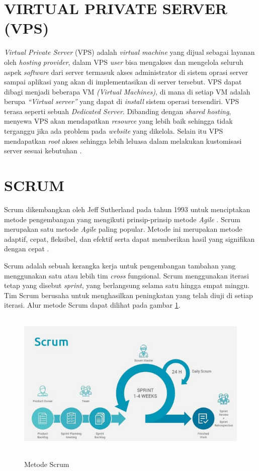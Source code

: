 \section{\uppercase{VIRTUAL PRIVATE SERVER (VPS)}}
\textit{Virtual Private Server} (VPS) adalah \textit{virtual machine} yang dijual sebagai layanan oleh \textit{hosting provider}, dalam VPS \textit{user} bisa mengakses dan mengelola seluruh aspek \textit{software} dari server termasuk akses administrator di sistem oprasi server sampai aplikasi yang akan di implementasikan di server tersebut. VPS dapat dibagi menjadi beberapa VM \textit{(Virtual Machines)}, di mana di setiap VM adalah berupa \textit{“Virtual server”} yang dapat di \textit{install} sistem operasi tersendiri. VPS terasa seperti sebuah \textit{Dedicated Server}. Dibanding dengan \textit{shared hosting}, menyewa VPS akan mendapatkan \textit{resource} yang lebih baik sehingga tidak terganggu jika ada problem pada \textit{website} yang dikelola. Selain itu VPS mendapatkan \textit{root} akses sehingga lebih leluasa dalam melakukan kustomisasi server sesuai kebutuhan \citep{hamida2017analisis}.

\section{\uppercase{SCRUM}}
Scrum dikembangkan oleh Jeff Sutherland pada tahun 1993 untuk menciptakan metode pengembangan yang mengikuti prinsip-prinsip metode \textit{Agile} \citep{fernando2018rancang}. Scrum merupakan satu metode \textit{Agile} paling popular. Metode ini merupakan metode adaptif, cepat, fleksibel, dan efektif serta dapat memberikan hasil yang signifikan dengan cepat \citep{hadinata2017implementasi}.

\par Scrum adalah sebuah kerangka kerja untuk pengembangan tambahan yang menggunakan satu atau lebih tim \textit{cross} fungsional. Scrum menggunakan iterasi tetap yang disebut \textit{sprint}, yang berlangsung selama satu hingga empat minggu. Tim Scrum berusaha untuk menghasilkan peningkatan yang telah diuji di setiap iterasi. Alur metode Scrum dapat dilihat pada gambar \ref{scrum}.

\begin{figure}[H]
\centering
{\includegraphics [width = 12.5cm, height= 7cm]{gambar/scrum}}
\caption{Metode Scrum \citep{wahyudi2018analisis}}
\label{scrum}
\end{figure}	

